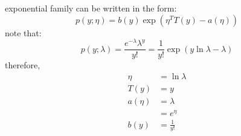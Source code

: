 \begin{answer}
    
    exponential family can be written in the form:
    $$
        p(y; \eta) = b(y)\exp{(\eta^TT(y)-a(\eta))}
    $$
    note that:
    $$
            p(y; \lambda) = \frac{e^{-\lambda}\lambda^y}{y!}
            =\frac{1}{y!}\exp(y\ln{\lambda}-\lambda)
    $$
    therefore, 
    $$
    \begin{aligned}
        \eta    &= \ln{\lambda} \\
        T(y)    &= y \\
        a(\eta) &= \lambda \\
                &= e^{\eta}\\
            b(y)&=\frac{1}{y!}
    \end{aligned}
    $$
\end{answer}
